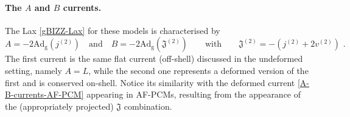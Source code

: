 \documentclass[12pt]{article}
\numberwithin{equation}{section}
\begin{document}
\paragraph{The $A$ and $B$ currents.} The Lax \eqref{gBIZZ-Lax} for these models is characterised by
\begin{equation}\label{AF-SSSM-J-Jtilde-def}
A=-2\mathrm{Ad}_{\mathrm{g}}(j^{(2)})
\quad 
\text{and}
\quad 
B=-2\mathrm{Ad}_{\mathrm{g}}(\mathfrak{J}^{(2)})
\qquad \text{with} \qquad \mathfrak{J}^{(2)}=-(j^{(2)}+2v^{(2)}) \,\, .
\end{equation}
The first current is the same flat current (off-shell) discussed in the undeformed setting, namely $A=L$, while the second one represents a deformed version of the first and is conserved on-shell. Notice its similarity with the deformed current \eqref{A-B-currents-AF-PCM} appearing in AF-PCMs, resulting from the appearance of the (appropriately projected) $\mathfrak{J}$ combination.
\end{document}
